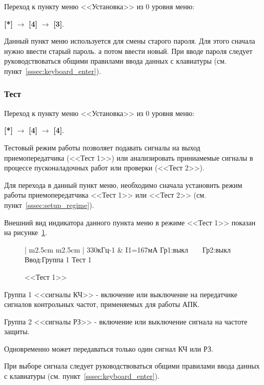 Переход к пункту меню <<Установка>> из 0 уровня меню: 

\textbf{[*]} $\rightarrow$ \textbf{[4]} $\rightarrow$ \textbf{[3]}.

Данный пункт меню используется для смены старого пароля. Для этого сначала нужно ввести старый пароль. а потом ввести новый. При вводе пароля следует руководствоваться общими правилами ввода данных с клавиатуры (см. пункт~\ref{sssec:keyboard_enter}).


\subsubsection{Тест}

Переход к пункту меню <<Установка>> из 0 уровня меню: 

\textbf{[*]} $\rightarrow$ \textbf{[4]} $\rightarrow$ \textbf{[4]}.

Тестовый режим работы позволяет подавать сигналы на выход приемопередатчика (<<Тест 1>>) или анализировать приниамемые сигналы в процессе пусконаладочных работ или проверки (<<Тест 2>>).

Для перехода в данный пункт меню, необходимо сначала установить режим работы приемопередатчика <<Тест 1>> или <<Тест 2>> (см. пункт~\ref{sssec:setup_regime}).

Внешний вид индикатора данного пункта меню в режиме <<Тест 1>> показан на рисунке~\ref{fig:setup_test_1}.
 
\begin{figure}[H]
	\centering
		
	\begin{tabular}{| m{2.5cm}  m{2.5cm} |}
		\firsthline
		330кГц-1	& \raggedleft I1=167мА			\tabularnewline 
		 {Гр1:выкл~~~~Гр2:выкл}	\tabularnewline
		 {Ввод:Группа 1} 		\tabularnewline 
		 {Тест 1}				\tabularnewline 
		\lasthline
	\end{tabular} 
	
	\caption{<<Тест 1>>}
	\label{fig:setup_test_1}
\end{figure}

Группа 1 <<сигналы КЧ>> - включение или выключение на передатчике сигналов контрольных частот, применяемых для работы АПК. 

Группа 2 <<сигналы РЗ>> - включение или выключение сигнала на частоте защиты. 

Одновременно может передаваться только один сигнал КЧ или РЗ.

При выборе сигнала следует руководствоваться общими правилами ввода данных с клавиатуры (см. пункт~\ref{sssec:keyboard_enter}).

